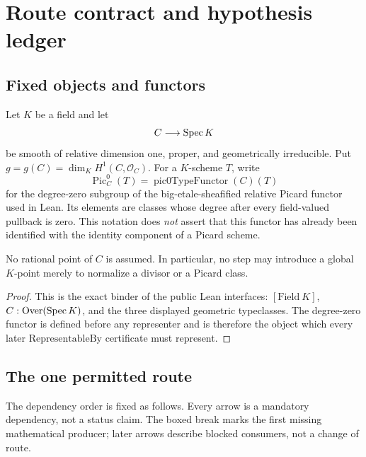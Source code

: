\chapter{Route contract and hypothesis ledger}
\label{route-ch-contract}

\section{Fixed objects and functors}

\begin{definition}
  \label{route-conv-objects}
  \leanok

  Let \(K\) be a field and let
  \[
    C\longrightarrow \operatorname{Spec} K
  \]
  be smooth of relative dimension one, proper, and geometrically irreducible.
  Put
  \(g=g(C)=\dim_K H^1(C,\mathcal O_C)\).  For a \(K\)-scheme \(T\), write
  \[
    \operatorname{Pic}^0_C(T)=\operatorname{pic0TypeFunctor}(C)(T)
  \]
  for the degree-zero subgroup of the big-etale-sheafified relative Picard
  functor used in Lean.  Its elements are classes whose degree after every
  field-valued pullback is zero.  This notation does \emph{not} assert that
  this functor has already been identified with the identity component of a
  Picard scheme.

  No rational point of \(C\) is assumed.  In particular, no step may introduce
  a global \(K\)-point merely to normalize a divisor or a Picard class.
\end{definition}

\begin{proof}
  This is the exact binder of the public Lean interfaces: \([\mathrm{Field}\ K]\),
  \(C:\mathrm{Over}(\operatorname{Spec} K)\), and the three displayed geometric typeclasses.  The
  degree-zero functor is defined before any representer and is therefore the
  object which every later \(\mathrm{RepresentableBy}\) certificate must
  represent.
\end{proof}

\section{The one permitted route}

The dependency order is fixed as follows.  Every arrow is a mandatory
dependency, not a status claim.  The boxed break marks the first missing
mathematical producer; later arrows describe blocked consumers, not a change
of route.

